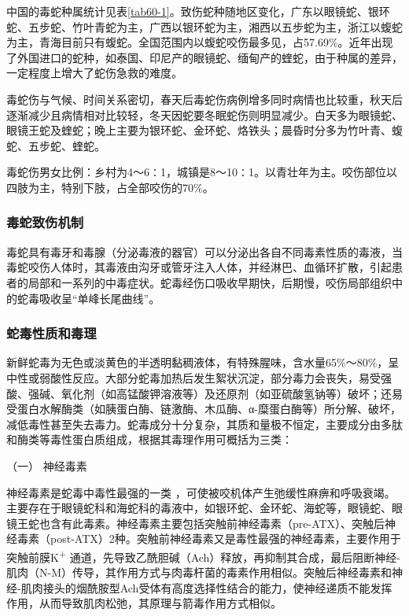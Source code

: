 中国的毒蛇种属统计见表\ref{tab60-1}。致伤蛇种随地区变化，广东以眼镜蛇、银环蛇、五步蛇、竹叶青蛇为主，广西以银环蛇为主，湘西以五步蛇为主，浙江以蝮蛇为主，青海目前只有蝮蛇。全国范围内以蝮蛇咬伤最多见，占57.69\%。近年出现了外国进口的蛇种，如泰国、印尼产的眼镜蛇、缅甸产的蝰蛇，由于种属的差异，一定程度上增大了蛇伤急救的难度。

毒蛇伤与气候、时间关系密切，春天后毒蛇伤病例增多同时病情也比较重，秋天后逐渐减少且病情相对比较轻，冬天因蛇要冬眠蛇伤则明显减少。白天多为眼镜蛇、眼镜王蛇及蝰蛇；晚上主要为银环蛇、金环蛇、烙铁头；晨昏时分多为竹叶青、蝮蛇、五步蛇、蝰蛇。

毒蛇伤男女比例：乡村为4～6∶1，城镇是8～10∶1。以青壮年为主。咬伤部位以四肢为主，特别下肢，占全部咬伤的70\%。

\subsubsection{毒蛇致伤机制}

毒蛇具有毒牙和毒腺（分泌毒液的器官）可以分泌出各自不同毒素性质的毒液，当毒蛇咬伤人体时，其毒液由沟牙或管牙注入人体，并经淋巴、血循环扩散，引起患者的局部和一系列的中毒症状。蛇毒经伤口吸收早期快，后期慢，咬伤局部组织中的蛇毒吸收呈“单峰长尾曲线”。

\subsubsection{蛇毒性质和毒理}

新鲜蛇毒为无色或淡黄色的半透明黏稠液体，有特殊腥味，含水量65\%～80\%，呈中性或弱酸性反应。大部分蛇毒加热后发生絮状沉淀，部分毒力会丧失，易受强酸、强碱、氧化剂（如高锰酸钾溶液等）及还原剂（如亚硫酸氢钠等）破坏；还易受蛋白水解酶类（如胰蛋白酶、链激酶、木瓜酶、α-糜蛋白酶等）所分解、破坏，减低毒性甚至失去毒力。蛇毒成分十分复杂，其质和量极不恒定，主要成分由多肽和酶类等毒性蛋白质组成，根据其毒理作用可概括为三类：

\hypertarget{text00172.htmlux5cux23CHP5-8-1-1-3-1}{}
（一） 神经毒素

神经毒素是蛇毒中毒性最强的一类
，可使被咬机体产生弛缓性麻痹和呼吸衰竭。主要存在于眼镜蛇科和海蛇科的毒液中，如银环蛇、金环蛇、海蛇等，眼镜蛇、眼镜王蛇也含有此毒素。神经毒素主要包括突触前神经毒素（pre-ATX）、突触后神经毒素（post-ATX）2种。突触前神经毒素又是毒性最强的神经毒素，主要作用于突触前膜K\textsuperscript{+}
通道，先导致乙酰胆碱（Ach）释放，再抑制其合成，最后阻断神经-肌肉（N-M）传导，其作用方式与肉毒杆菌的毒素作用相似。突触后神经毒素和神经-肌肉接头的烟酰胺型Ach受体有高度选择性结合的能力，使神经递质不能发挥作用，从而导致肌肉松弛，其原理与箭毒作用方式相似。

